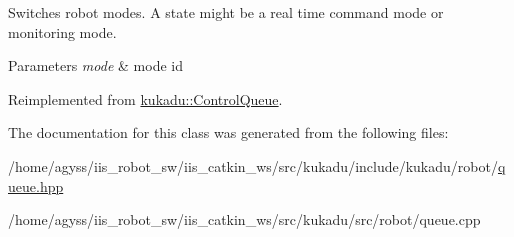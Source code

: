 Switches robot modes. A state might be a real time command mode or monitoring mode. 


\begin{DoxyParams}{Parameters}
{\em mode} & mode id \\
\hline
\end{DoxyParams}


Reimplemented from \hyperlink{classkukadu_1_1ControlQueue_a5defe63d9f1b9829676f9a31a4683911}{kukadu\+::\+Control\+Queue}.



The documentation for this class was generated from the following files\+:\begin{DoxyCompactItemize}
\item 
/home/agyss/iis\+\_\+robot\+\_\+sw/iis\+\_\+catkin\+\_\+ws/src/kukadu/include/kukadu/robot/\hyperlink{queue_8hpp}{queue.\+hpp}\item 
/home/agyss/iis\+\_\+robot\+\_\+sw/iis\+\_\+catkin\+\_\+ws/src/kukadu/src/robot/queue.\+cpp\end{DoxyCompactItemize}
